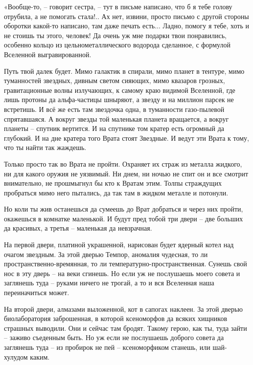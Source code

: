 \documentclass[ebook,oneside,final,openright]{memoir}
\begin{document}
\par
«Вообще-то, – говорит сестра, – тут в письме написано, что б я тебе голову отрубила, а не помогать стала!.. Ах нет, извини, просто письмо с другой стороны оборотки какой-то написано, там даже печать есть... Ладно, помогу я тебе, хоть и не стоишь ты этого, человек! Да очень уж мне подарки твои понравились, особенно кольцо из цельнометаллического водорода сделанное, с формулой Вселенной выгравированной.\par
\par
Путь твой далек будет. Мимо галактик в спирали, мимо планет в тентуре, мимо туманностей звездных, дивным светом сияющих, мимо квазаров грозных, гравитационные волны излучающих, к самому краю видимой Вселенной, где лишь протоны да альфа-частицы шныряют, а звезду и на миллион парсек не встретишь. И всё же есть там звездочка одна, в туманности газо-пылевой спрятавшаяся. А вокруг звезды той маленькая планета вращается, а вокруг планеты – спутник вертится. И на спутнике том кратер есть огромный да глубокий. И на дне кратера того Врата стоят Звездные. И ведут эти Врата к тому, что ты найти так жаждешь.\par
\par
Только просто так во Врата не пройти. Охраняет их страж из металла жидкого, ни для какого оружия не уязвимый. Ни днем, ни ночью не спит он и все смотрит внимательно, не прошмыгнул бы кто к Вратам этим. Толпы страждущих пробраться мимо него пытались, да так там в жидком металле и потонули.\par
\par
Но коли ты жив останешься да сумеешь до Врат добраться и через них пройти, окажешься в комнатке маленькой. И будут пред тобой три двери – две больших да красивых, а третья – маленькая да невзрачная.\par
\par
На первой двери, платиной украшенной, нарисован будет ядерный котел над очагом звездным. За этой дверью Темпор, аномалия чудесная, то ли пространственно-времянная, то ли температурно-пространственная. Сунешь свой нос в эту дверь – на веки сгинешь. Но если уж не послушаешь моего совета и заглянешь туда – руками ничего не трогай, а то и вся Вселенная наша переиначиться может.\par
\par
На второй двери, алмазами выложенной, кот в сапогах наклеен. За этой дверью биолаборатория заброшенная, в которой ксеноморфов да всяких хищников страшных выводили. Они и сейчас там бродят. Такому герою, как ты, туда зайти – заживо съеденным быть. Но уж если не послушаешь доброго совета да заглянешь туда – из пробирок не пей – ксеноморфиком станешь, или шай-хулудом каким.\par
\end{document}
